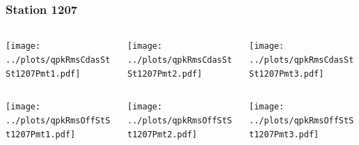 \documentclass[aspectratio=169]{beamer}
\begin{document}
\begin{frame} 
  \frametitle{Station 1207}
  \begin{center}
    \begin{columns}
      \begin{column}{0.33\textwidth}
        \texttt{[image: ../plots/qpkRmsCdasStSt1207Pmt1.pdf]}
      \end{column}
      \begin{column}{0.33\textwidth}
        \texttt{[image: ../plots/qpkRmsCdasStSt1207Pmt2.pdf]}
      \end{column}
      \begin{column}{0.33\textwidth}
        \texttt{[image: ../plots/qpkRmsCdasStSt1207Pmt3.pdf]}
      \end{column}
    \end{columns}
  \end{center}

  \begin{center}
    \begin{columns}
      \begin{column}{0.33\textwidth}
        \texttt{[image: ../plots/qpkRmsOffStSt1207Pmt1.pdf]}
      \end{column}
      \begin{column}{0.33\textwidth}
        \texttt{[image: ../plots/qpkRmsOffStSt1207Pmt2.pdf]}
      \end{column}
      \begin{column}{0.33\textwidth}
        \texttt{[image: ../plots/qpkRmsOffStSt1207Pmt3.pdf]}
      \end{column}
    \end{columns}
  \end{center}
\end{frame}
\end{document}
